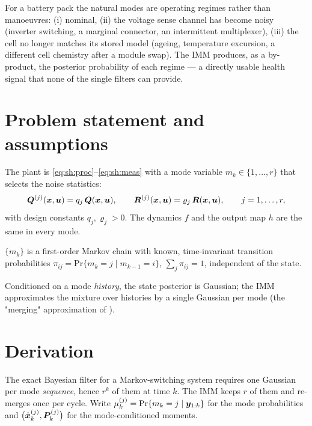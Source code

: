 For a battery pack the natural modes are operating regimes rather than manoeuvres: (i) nominal,
(ii) the voltage sense channel has become noisy (inverter switching, a marginal connector, an
intermittent multiplexer), (iii) the cell no longer matches its stored model (ageing, temperature
excursion, a different cell chemistry after a module swap).  The IMM produces, as a by-product, the
posterior probability of each regime --- a directly usable health signal that none of the single
filters can provide.

\section{Problem statement and assumptions}
The plant is \eqref{eq:sh:proc}--\eqref{eq:sh:meas} with a mode variable
$m_k\in\{1,\dots,r\}$ that selects the noise statistics:
\begin{equation}
\bm{Q}^{(j)}(\bm{x},\bm{u}) = q_j\,\bm{Q}(\bm{x},\bm{u}),\qquad
\bm{R}^{(j)}(\bm{x},\bm{u}) = \varrho_j\,\bm{R}(\bm{x},\bm{u}),\qquad j = 1,\dots,r,
\label{eq:imm:modes}
\end{equation}
with design constants $q_j,\varrho_j>0$.  The dynamics $f$ and the output map $h$ are the same in
every mode.
\begin{assumption}\label{as:imm:markov}
$\{m_k\}$ is a first-order Markov chain with known, time-invariant transition probabilities
$\pi_{ij} = \mathrm{Pr}\{m_k=j\mid m_{k-1}=i\}$, $\sum_j\pi_{ij}=1$, independent of the state.
\end{assumption}
\begin{assumption}\label{as:imm:gauss}
Conditioned on a mode \emph{history}, the state posterior is Gaussian; the IMM approximates the
mixture over histories by a single Gaussian per mode (the "merging" approximation of
\cite{blom1988imm}).
\end{assumption}

\section{Derivation}
The exact Bayesian filter for a Markov-switching system requires one Gaussian per mode
\emph{sequence}, hence $r^k$ of them at time $k$.  The IMM keeps $r$ of them and re-merges once per
cycle.  Write $\mu_{k}^{(j)} = \mathrm{Pr}\{m_k=j\mid\bm{y}_{1:k}\}$ for the mode probabilities and
$\big(\hat{\bm{x}}^{(j)}_{k},\bm{P}^{(j)}_{k}\big)$ for the mode-conditioned moments.

